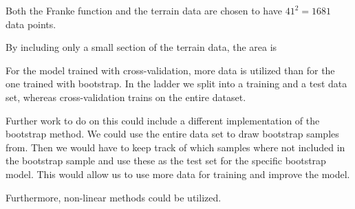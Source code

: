 
Both the Franke function and the terrain data are chosen to have $41^2 = 1681$ data points. 

By including only a small section of the terrain data, the area is 


For the model trained with cross-validation, more data is utilized than for the one trained with bootstrap. In the ladder we split into a training and a test data set, whereas cross-validation trains on the entire dataset. 


Further work to do on this could include a different implementation of the bootstrap method. We could use the entire data set to draw bootstrap samples from. Then we would have to keep track of which samples where not included in the bootstrap sample and use these as the test set for the specific bootstrap model. This would allow us to use more data for training and improve the model. 

Furthermore, non-linear methods could be utilized. 